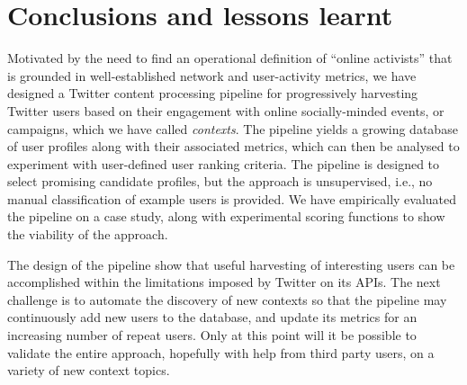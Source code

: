 \vspace{-10pt}
\section{Conclusions and lessons learnt}
\vspace{-10pt}


Motivated by the need to find an operational definition of ``online activists'' that is grounded in well-established network and user-activity metrics, we have designed a Twitter content processing pipeline for progressively harvesting Twitter users based on their engagement with online socially-minded events, or campaigns, which we have called \textit{contexts}.
The pipeline yields a growing database of user profiles along with their associated metrics, which can then be analysed to experiment with user-defined user ranking criteria. The pipeline is  designed to select promising candidate profiles, but the approach is unsupervised, i.e., no manual classification of example users is provided.
We have empirically evaluated the pipeline on a case study, along with experimental scoring functions to show the viability of the approach. 

The design of the pipeline show that useful harvesting of interesting users can be accomplished within the limitations imposed by Twitter on its APIs.
The next challenge is to automate the discovery of new contexts so that the pipeline may continuously add new users to the database, and update its metrics for an increasing number of  repeat users.
Only at this point will it be possible to   validate the entire approach, hopefully with help from third party users, on a variety of new context topics.